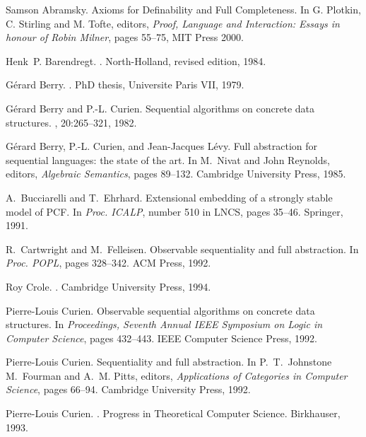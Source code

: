 \documentclass[11pt]{article}
\begin{document}
\begin{thebibliography}{Cur92b}
Samson Abramsky.
\newblock Axioms for Definability and Full Completeness.
\newblock In G. Plotkin, C. Stirling and M. Tofte, editors,
{\em Proof, Language and Interaction: Essays in honour of
Robin Milner}, pages 55--75, MIT Press 2000.

Henk~P. Barendregt.
.
\newblock North-Holland, revised edition, 1984.

G{\'e}rard Berry.
.
\newblock PhD thesis, Universite Paris VII, 1979.

G{\'e}rard Berry and P.-L. Curien.
\newblock Sequential algorithms on concrete data structures.
, 20:265--321, 1982.

G{\'e}rard Berry, P.-L. Curien, and Jean-Jacques L\'evy.
\newblock Full abstraction for sequential languages: the state of the art.
\newblock In M.~Nivat and John Reynolds, editors, {\em Algebraic Semantics},
  pages 89--132. Cambridge University Press, 1985.

A.~Bucciarelli and T.~Ehrhard.
\newblock Extensional embedding of a strongly stable model of {PCF}.
\newblock In {\em Proc. ICALP}, number 510 in LNCS, pages 35--46. Springer,
  1991.

R.~Cartwright and M.~Felleisen.
\newblock Observable sequentiality and full abstraction.
\newblock In {\em Proc. POPL}, pages 328--342. ACM {P}ress, 1992.

Roy Crole.
.
\newblock Cambridge University Press, 1994.

Pierre-Louis Curien.
\newblock Observable sequential algorithms on concrete data structures.
\newblock In {\em Proceedings, {S}eventh {A}nnual {IEEE} {S}ymposium on {L}ogic
  in {C}omputer {S}cience}, pages 432--443. IEEE {C}omputer {S}cience {P}ress,
  1992.

Pierre-Louis Curien.
\newblock Sequentiality and full abstraction.
\newblock In P.~T.~Johnstone M.~Fourman and A.~M. Pitts, editors, {\em
  Applications of Categories in Computer Science}, pages 66--94. Cambridge
  University Press, 1992.

Pierre-Louis Curien.
.
\newblock Progress in Theoretical Computer Science. Birkhauser, 1993.


\end{thebibliography}
\end{document}
